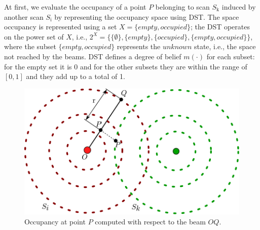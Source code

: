At first, we evaluate the occupancy of a point $P$ belonging to scan $S_{\text{k}}$ induced by another scan $S_{\text{i}}$ by representing the occupancy space using DST.  The space occupancy is represented using a set $X = \{empty, occupied\}$; the DST operates on the power set of $X$, i.e., $2^X = \{\{\emptyset\}, \{empty\}, \{occupied\}, \{empty,occupied\}\}$, where the subset $\{empty,occupied\}$ represents the $unknown$ state, i.e., the space not reached by the beams. DST defines a degree of belief $m(\cdot)$ for each subset: for the empty set it is 0 and for the other subsets they are within the range of $[0, 1]$ and they add up to a total of 1.

\begin{figure}[t]
\centering
\includegraphics[width=0.99\columnwidth]{./img/ch-laser/scanoccupancy}
\caption{Occupancy at point $P$ computed with respect to the beam $OQ$.}
\label{fig:scanocc}
\end{figure}

